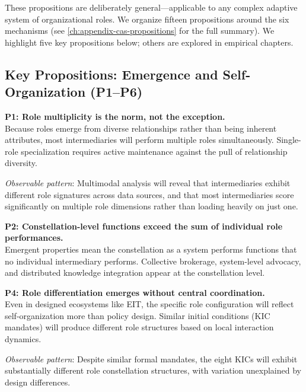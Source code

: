 \documentclass[../main.tex]{subfiles}
\begin{document}
These propositions are deliberately general---applicable to any complex adaptive system of organizational roles. We organize fifteen propositions around the six mechanisms (see \cref{ch:appendix-cas-propositions} for the full summary). We highlight five key propositions below; others are explored in empirical chapters.

\subsection{Key Propositions: Emergence and Self-Organization (P1--P6)}

\begin{propositionbox}
\textbf{P1: Role multiplicity is the norm, not the exception.} \parencite{padgett1993robust, merton1957role}\\[3pt]
Because roles emerge from diverse relationships rather than being inherent attributes, most intermediaries will perform multiple roles simultaneously. Single-role specialization requires active maintenance against the pull of relationship diversity.

\vspace{4pt}
\textit{Observable pattern}: Multimodal analysis will reveal that intermediaries exhibit different role signatures across data sources, and that most intermediaries score significantly on multiple role dimensions rather than loading heavily on just one.
\end{propositionbox}

\begin{propositionbox}
\textbf{P2: Constellation-level functions exceed the sum of individual role performances.} \parencite{hekkert2007functions, giddens1984constitution}\\[3pt]
Emergent properties mean the constellation as a system performs functions that no individual intermediary performs. Collective brokerage, system-level advocacy, and distributed knowledge integration appear at the constellation level.
\end{propositionbox}

\begin{propositionbox}
\textbf{P4: Role differentiation emerges without central coordination.} \parencite{powell1996interorganizational, hannan1977population}\\[3pt]
Even in designed ecosystems like EIT, the specific role configuration will reflect self-organization more than policy design. Similar initial conditions (KIC mandates) will produce different role structures based on local interaction dynamics.

\vspace{4pt}
\textit{Observable pattern}: Despite similar formal mandates, the eight KICs will exhibit substantially different role constellation structures, with variation unexplained by design differences.
\end{propositionbox}
\end{document}
